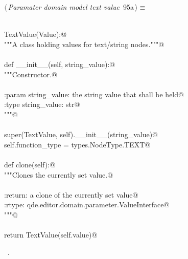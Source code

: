 \documentclass[
    a4paper,      %
    10pt,         %
    openright,    %
    notitlepage,  %
    parskip=half, %
]{scrreprt}       %
\theoremstyle{definition}                    %
\begin{document}
\begin{flushleft} \small
\begin{minipage}{\linewidth}\label{scrap151}\raggedright\small
{} $\langle\,${\itshape Paramater domain model text value}\nobreak\ {\footnotesize {95a}}$\,\rangle\equiv$
\vspace{-1exm}
\begin{list}{}{} \item
\mbox{}\lstinline@@\\
\mbox{}\lstinline@class TextValue(Value):@\\
\mbox{}\lstinline@    """A class holding values for text/string nodes."""@\\
\mbox{}\lstinline@@\\
\mbox{}\lstinline@    def __init__(self, string_value):@\\
\mbox{}\lstinline@        """Constructor.@\\
\mbox{}\lstinline@@\\
\mbox{}\lstinline@        :param string_value: the string value that shall be held@\\
\mbox{}\lstinline@        :type  string_value: str@\\
\mbox{}\lstinline@        """@\\
\mbox{}\lstinline@@\\
\mbox{}\lstinline@        super(TextValue, self).__init__(string_value)@\\
\mbox{}\lstinline@        self.function_type = types.NodeType.TEXT@\\
\mbox{}\lstinline@@\\
\mbox{}\lstinline@    def clone(self):@\\
\mbox{}\lstinline@        """Clones the currently set value.@\\
\mbox{}\lstinline@@\\
\mbox{}\lstinline@        :return: a clone of the currently set value@\\
\mbox{}\lstinline@        :rtype:  qde.editor.domain.parameter.ValueInterface@\\
\mbox{}\lstinline@        """@\\
\mbox{}\lstinline@@\\
\mbox{}\lstinline@        return TextValue(self.value)@{\NWsep}
\end{list}
\vspace{-1.5ex}
\footnotesize
\begin{list}{}{\setlength{\itemsep}{-\parsep}\setlength{\itemindent}{-\leftmargin}}
\item \NWtxtMacroRefIn\ .

\item{}
\end{list}
\end{minipage}\vspace{4ex}
\end{flushleft}
\end{document}
